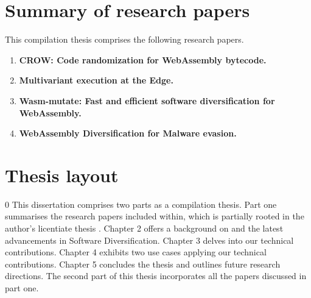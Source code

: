 \section{Summary of research papers}

This compilation thesis comprises the following research papers.

\begin{enumerate}[label={\textbf{P\arabic*}:}, ref={P\arabic*}]
	\item \label{crowpaper} \textbf{CROW: Code randomization for WebAssembly bytecode.} \\ 
	 \lipsum[1]
	\item \label{mewepaper} \textbf{Multivariant execution at the Edge. } \\ 
	 \lipsum[1]
	\item \label{wasmmutatepaper} \textbf{ Wasm-mutate: Fast and efficient software diversification for WebAssembly. }\\ 
	 \lipsum[1]
	\item \label{evasionpaper} \textbf{WebAssembly Diversification for Malware evasion.} \\ 
	 \lipsum[1]
 
\end{enumerate}



\section*{Thesis layout}0
This dissertation comprises two parts as a compilation thesis. 
Part one summarises the research papers included within, which is partially rooted in the author's licentiate thesis \cite{Lic}. 
Chapter 2 offers a background on \Wasm and the latest advancements in Software Diversification. 
Chapter 3 delves into our technical contributions. 
Chapter 4 exhibits two use cases applying our technical contributions. 
Chapter 5 concludes the thesis and outlines future research directions. 
The second part of this thesis incorporates all the papers discussed in part one.

